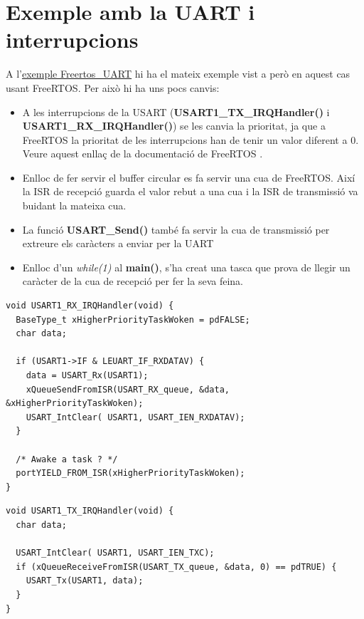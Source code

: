 \chapter{Exemple amb la UART i interrupcions}
A l’\href{https://github.com/mariusmm/cursembedded/tree/master/Simplicity/FreeRTOS_UART}{exemple Freertos\_UART} hi ha el mateix exemple vist a  però en aquest cas usant FreeRTOS. Per això hi ha uns pocs canvis:
\begin{itemize}
 \item A les interrupcions de la USART ({\bf USART1\_TX\_IRQHandler()} i {\bf USART1\_RX\_IRQHandler()}) se les canvia la prioritat, ja que a FreeRTOS la prioritat de les interrupcions han de tenir un valor diferent a 0. Veure aquest enllaç de la documentació de FreeRTOS \cite{FreeRTOSIRQ}.
 \item Enlloc de fer servir el \gls{buffer circular} es fa servir una cua de FreeRTOS. Així la \gls{ISR} de recepció guarda el valor rebut a una cua i la \gls{ISR} de transmissió va buidant la mateixa cua.
 \item La funció {\bf USART\_Send()} també fa servir la cua de transmissió per extreure els caràcters a enviar per la UART
 \item Enlloc d’un {\em while(1)} al {\bf main()}, s'ha creat una tasca que prova de llegir un caràcter de la cua de recepció per fer la seva feina.
\end{itemize}

 \begin{lstlisting}[style=customc,caption={ISR de RX de la UART amb FreeRTOS}]
void USART1_RX_IRQHandler(void) {
  BaseType_t xHigherPriorityTaskWoken = pdFALSE;
  char data;

  if (USART1->IF & LEUART_IF_RXDATAV) {
    data = USART_Rx(USART1);
    xQueueSendFromISR(USART_RX_queue, &data, &xHigherPriorityTaskWoken);
    USART_IntClear( USART1, USART_IEN_RXDATAV);
  }

  /* Awake a task ? */
  portYIELD_FROM_ISR(xHigherPriorityTaskWoken);
}
\end{lstlisting}

\begin{lstlisting}[style=customc,caption={ISR de TX de la UART amb FreeRTOS}]
void USART1_TX_IRQHandler(void) {
  char data;

  USART_IntClear( USART1, USART_IEN_TXC);
  if (xQueueReceiveFromISR(USART_TX_queue, &data, 0) == pdTRUE) {
    USART_Tx(USART1, data);
  }
}
\end{lstlisting}

